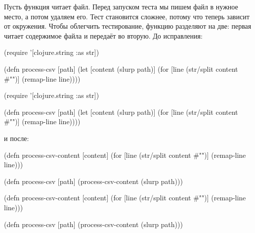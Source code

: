Пусть функция читает файл. Перед запуском теста мы пишем файл в нужное место, а
потом удаляем его. Тест становится сложнее, потому что теперь зависит от
окружения. Чтобы облегчить тестирование, функцию разделяют на две: первая читает
содержимое файла и передаёт во вторую. До исправления:


\ifnarrow

\begin{english}
  \begin{clojure}
(require '[clojure.string :as str])

(defn process-csv [path]
  (let [content (slurp path)]
    (for [line (str/split content #"\n")]
      (remap-line line))))
  \end{clojure}
\end{english}

\else

\begin{english}
  \begin{clojure}
(require '[clojure.string :as str])

(defn process-csv [path]
  (let [content (slurp path)]
    (for [line (str/split content #"\n")]
      (remap-line line))))
  \end{clojure}
\end{english}

\fi

\noindent
и после:

\ifnarrow

\begin{english}
  \begin{clojure}
(defn process-csv-content [content]
  (for [line (str/split content #"\n")]
    (remap-line line)))

(defn process-csv [path]
  (process-csv-content (slurp path)))
  \end{clojure}
\end{english}

\else

\begin{english}
  \begin{clojure}
(defn process-csv-content [content]
  (for [line (str/split content #"\n")]
    (remap-line line)))

(defn process-csv [path]
  (process-csv-content (slurp path)))
  \end{clojure}
\end{english}

\fi


